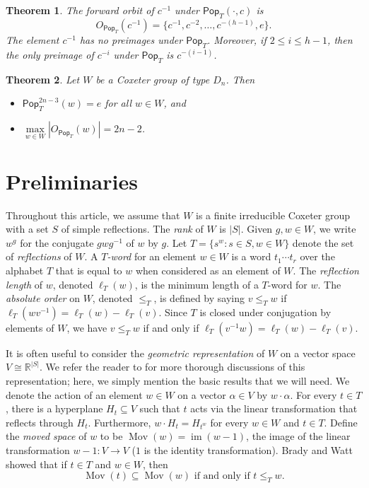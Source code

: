 \documentclass[10pt,a4paper]{amsart}
\newtheorem{theorem}{Theorem}[section]
\newcommand{\darkblue}{\color{darkblue}}
\newcommand{\defn}[1]{\emph{\darkblue #1}}
\newcommand{\pop}{\mathsf{Pop}}
\DeclareMathOperator{\mov}{Mov}
\DeclareMathOperator{\im}{im}
\begin{document}
\begin{theorem}
\label{thm:cinverseorbit}
The forward orbit of $c^{-1}$ under $\pop_T(\cdot,c)$ is 
\[
O_{\pop_T}(c^{-1})=\{c^{-1}, c^{-2},\ldots, c^{-(h-1)}, e\}.
\]
 The element $c^{-1}$ has no preimages under $\pop_T$. Moreover, if $2\leq i\leq h-1$, then the only preimage of $c^{-i}$ under $\pop_T$ is $c^{-(i-1)}$. 
\end{theorem}

\setcounter{theorem}{4}
\begin{theorem}
\label{thm:main2}
Let $W$ be a Coxeter group of type $D_n$. Then 
\begin{itemize}
    \item $\pop_T^{2n-3}(w)=e$ for all $w\in W$, and
    \item  $\max\limits _{w\in W}\left|O_{\pop_T}(w)\right|=2n-2$.
\end{itemize}
\end{theorem}

\section{Preliminaries}
Throughout this article, we assume that $W$ is a finite irreducible Coxeter group with a set $S$ of simple reflections. The \defn{rank} of $W$ is $|S|$. Given $g,w\in W$, we write $w^g$ for the conjugate $gwg^{-1}$ of $w$ by $g$. Let $T=\{s^w:s\in S, w\in W\}$ denote the set of \defn{reflections} of $W$. A \defn{$T$-word} for an element $w\in W$ is a word $t_1\cdots t_r$ over the alphabet $T$ that is equal to $w$ when considered as an element of $W$. The \defn{reflection length} of $w$, denoted $\ell_T(w)$, is the minimum length of a $T$-word for $w$. The \defn{absolute order} on $W$, denoted $\leq_T$, is defined by saying $v\leq_T w$ if $\ell_T(wv^{-1})=\ell_T(w)-\ell_T(v)$. Since $T$ is closed under conjugation by elements of $W$, we have $v\leq_T w$ if and only if $\ell_T(v^{-1}w)=\ell_T(w)-\ell_T(v)$. 

It is often useful to consider the \defn{geometric representation} of $W$ on a vector space $V\cong\mathbb R^{|S|}$. We refer the reader to \cite{armstrong2009generalized, BjornerBrenti} for more thorough discussions of this representation; here, we simply mention the basic results that we will need. We denote the action of an element $w\in W$ on a vector $\alpha\in V$ by $w\cdot\alpha$. For every $t\in T$, there is a hyperplane $H_t\subseteq V$ such that $t$ acts via the linear transformation that reflects through $H_t$. Furthermore, $w\cdot H_t=H_{t^w}$ for every $w\in W$ and $t\in T$. Define the \defn{moved space} of $w$ to be $\mov(w)=\im(w-1)$, the image of the linear transformation $w-1:V\to V$ ($1$ is the identity transformation). Brady and Watt \cite{BradyWatt} showed that if $t\in T$ and $w\in W$, then \begin{equation}\label{EqBradyWatt}
\mov(t)\subseteq\mov(w)\text{ if and only if }t\leq _T w.
\end{equation}
\end{document}
